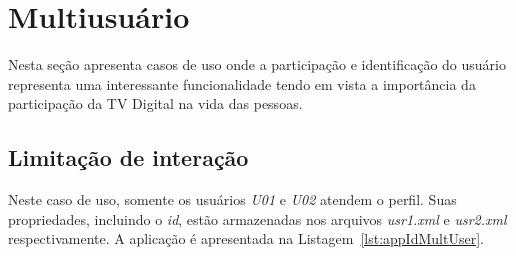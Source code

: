 \section{Multiusuário} \label{sec:casoUsoMultiusuario}

Nesta seção apresenta casos de uso onde a participação e identificação do usuário representa uma interessante funcionalidade tendo em vista a importância da participação da TV Digital na vida das pessoas.  

\subsection{Limitação de interação} \label{sec:casoUsoLimiteInteracao}
Neste caso de uso, somente os usuários \textit{U01} e \textit{U02} atendem o perfil. Suas propriedades, incluindo o \textit{id}, estão armazenadas nos arquivos \textit{usr1.xml} e \textit{usr2.xml} respectivamente. A aplicação é apresentada na Listagem~\ref{lst:appIdMultUser}.


